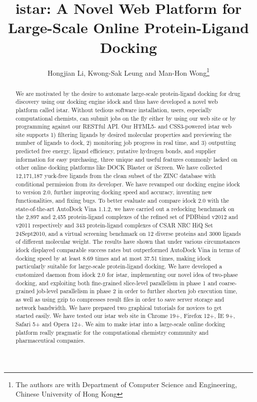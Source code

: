 \documentclass[12pt]{article}
\title{istar: A Novel Web Platform for Large-Scale Online Protein-Ligand Docking}
\author{Hongjian Li, Kwong-Sak Leung and Man-Hon Wong\thanks{The authors are with Department of Computer Science and Engineering, Chinese University of Hong Kong}}
\begin{document}
\maketitle

\begin{abstract}
We are motivated by the desire to automate large-scale protein-ligand docking for drug discovery using our docking engine idock and thus have developed a novel web platform called istar. Without tedious software installation, users, especially computational chemists, can submit jobs on the fly either by using our web site or by programming against our RESTful API. Our HTML5- and CSS3-powered istar web site supports 1) filtering ligands by desired molecular properties and previewing the number of ligands to dock, 2) monitoring job progress in real time, and 3) outputting predicted free energy, ligand efficiency, putative hydrogen bonds, and supplier information for easy purchasing, three unique and useful features commonly lacked on other online docking platforms like DOCK Blaster or iScreen. We have collected 12,171,187 yuck-free ligands from the clean subset of the ZINC database with conditional permission from its developer. We have revamped our docking engine idock to version 2.0, further improving docking speed and accuracy, inventing new functionalities, and fixing bugs. To better evaluate and compare idock 2.0 with the state-of-the-art AutoDock Vina 1.1.2, we have carried out a redocking benchmark on the 2,897 and 2,455 protein-ligand complexes of the refined set of PDBbind v2012 and v2011 respectively and 343 protein-ligand complexes of CSAR NRC HiQ Set 24Sept2010, and a virtual screening benchmark on 12 diverse proteins and 3000 ligands of different molecular weight. The results have shown that under various circumstances idock displayed comparable success rates but outperformed AutoDock Vina in terms of docking speed by at least 8.69 times and at most 37.51 times, making idock particularly suitable for large-scale protein-ligand docking. We have developed a customized daemon from idock 2.0 for istar, implementing our novel idea of two-phase docking, and exploiting both fine-grained slice-level parallelism in phase 1 and coarse-grained job-level parallelism in phase 2 in order to further shorten job execution time, as well as using gzip to compresses result files in order to save server storage and network bandwidth. We have prepared two graphical tutorials for novices to get started easily. We have tested our istar web site in Chrome 19+, Firefox 12+, IE 9+, Safari 5+ and Opera 12+. We aim to make istar into a large-scale online docking platform really pragmatic for the computational chemistry community and pharmaceutical companies.
\end{abstract}
\end{document}
